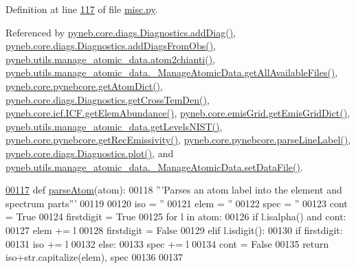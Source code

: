 Definition at line \hyperlink{misc_8py_source_l00117}{117} of file \hyperlink{misc_8py_source}{misc.\+py}.



Referenced by \hyperlink{diags_8py_source_l00246}{pyneb.\+core.\+diags.\+Diagnostics.\+add\+Diag()}, \hyperlink{diags_8py_source_l00353}{pyneb.\+core.\+diags.\+Diagnostics.\+add\+Diags\+From\+Obs()}, \hyperlink{manage__atomic__data_8py_source_l00009}{pyneb.\+utils.\+manage\+\_\+atomic\+\_\+data.\+atom2chianti()}, \hyperlink{manage__atomic__data_8py_source_l00190}{pyneb.\+utils.\+manage\+\_\+atomic\+\_\+data.\+\_\+\+Manage\+Atomic\+Data.\+get\+All\+Available\+Files()}, \hyperlink{pynebcore_8py_source_l03092}{pyneb.\+core.\+pynebcore.\+get\+Atom\+Dict()}, \hyperlink{diags_8py_source_l00554}{pyneb.\+core.\+diags.\+Diagnostics.\+get\+Cross\+Tem\+Den()}, \hyperlink{icf_8py_source_l00954}{pyneb.\+core.\+icf.\+I\+C\+F.\+get\+Elem\+Abundance()}, \hyperlink{emis_grid_8py_source_l00312}{pyneb.\+core.\+emis\+Grid.\+get\+Emis\+Grid\+Dict()}, \hyperlink{manage__atomic__data_8py_source_l00602}{pyneb.\+utils.\+manage\+\_\+atomic\+\_\+data.\+get\+Levels\+N\+I\+S\+T()}, \hyperlink{pynebcore_8py_source_l03036}{pyneb.\+core.\+pynebcore.\+get\+Rec\+Emissivity()}, \hyperlink{pynebcore_8py_source_l03167}{pyneb.\+core.\+pynebcore.\+parse\+Line\+Label()}, \hyperlink{diags_8py_source_l00421}{pyneb.\+core.\+diags.\+Diagnostics.\+plot()}, and \hyperlink{manage__atomic__data_8py_source_l00380}{pyneb.\+utils.\+manage\+\_\+atomic\+\_\+data.\+\_\+\+Manage\+Atomic\+Data.\+set\+Data\+File()}.


\begin{DoxyCode}
\hypertarget{namespacepyneb_1_1utils_1_1misc_l00117}{}\hyperlink{namespacepyneb_1_1utils_1_1misc_a8c069186002a3e73dd474958e35034d5}{00117} \textcolor{keyword}{def }\hyperlink{namespacepyneb_1_1utils_1_1misc_a8c069186002a3e73dd474958e35034d5}{parseAtom}(atom):
00118     \textcolor{stringliteral}{'''Parses an atom label into the element and spectrum parts'''}
00119 
00120     iso = \textcolor{stringliteral}{''}
00121     elem = \textcolor{stringliteral}{''}
00122     spec = \textcolor{stringliteral}{''}
00123     cont = \textcolor{keyword}{True}
00124     firstdigit = \textcolor{keyword}{True}
00125     \textcolor{keywordflow}{for} l \textcolor{keywordflow}{in} atom:
00126         \textcolor{keywordflow}{if} l.isalpha() \textcolor{keywordflow}{and} cont:
00127             elem += l
00128             firstdigit = \textcolor{keyword}{False}
00129         \textcolor{keywordflow}{elif} l.isdigit():
00130             \textcolor{keywordflow}{if} firstdigit:
00131                 iso += l
00132             \textcolor{keywordflow}{else}:
00133                 spec += l
00134                 cont = \textcolor{keyword}{False}
00135     \textcolor{keywordflow}{return} iso+str.capitalize(elem), spec
00136 
00137 
\end{DoxyCode}
\hypertarget{namespacepyneb_1_1utils_1_1misc_afa4163f24be7b1472200c24824c72ae1}{}

